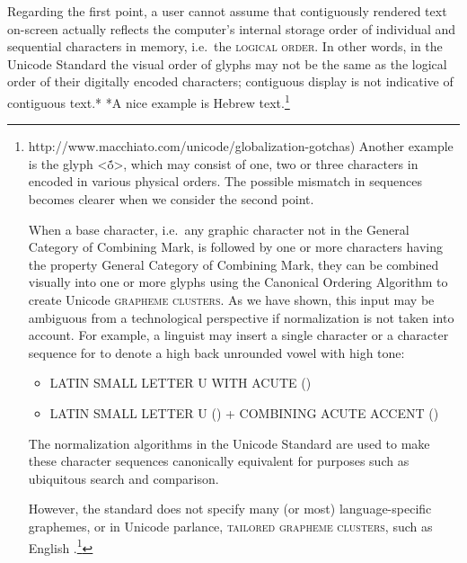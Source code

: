 {{{{{{{{{{{{{{{{{{{{{{{{{{{{{{{{{{{{{{{{{{{{{{{{{{{{{{{Regarding the first point, a user cannot assume that contiguously rendered text on-screen actually reflects the computer's internal storage order of individual and sequential characters in memory, i.e.~the \textsc{logical order}. In other words, in the Unicode Standard the visual order of glyphs may not be the same as the logical order of their digitally encoded characters; contiguous display is not indicative of contiguous text.* *A nice example is Hebrew text.\footnote{http://www.macchiato.com/unicode/globalization-gotchas) Another example is the glyph <ṍ>, which may consist of one, two or three characters in encoded in various physical orders. The possible mismatch in sequences becomes clearer when we consider the second point.

When a base character, i.e.~any graphic character not in the General Category of Combining Mark, is followed by one or more characters having the property General Category of Combining Mark, they can be combined visually into one or more glyphs using the Canonical Ordering Algorithm to create Unicode \textsc{grapheme clusters}. As we have shown, this input may be ambiguous from a technological perspective if normalization is not taken into account. For example, a linguist may insert a single character or a character sequence for to denote a high back unrounded vowel with high tone:
\begin{itemize}
	\item LATIN SMALL LETTER U WITH ACUTE () 
	\item LATIN SMALL LETTER U () + COMBINING ACUTE ACCENT () 
\end{itemize}

The normalization algorithms in the Unicode Standard are used to make these character sequences canonically equivalent for purposes such as ubiquitous search and comparison.

However, the standard does not specify many (or most) language-specific graphemes, or in Unicode parlance, \textsc{tailored grapheme clusters}, such as English .\footnote{Some (unfortunate) exceptions included for legacy purposes, and used incorrectly by linguists, include digraphs like LATIN SMALL LETTER TS DIGRAPH at  or LATIN SMALL LETTER DEZH DIGRAPH at . These and other digraphs are encoded in the Unicode Standard's IPA Extensions block.) For technological reasons, these language-specific tailored grapheme clusters must be defined outside of the Unicode Standard, in what are called (language-specific) Unicode Locale Descriptions.\footnote{http://www.unicode.org/reports/tr35/) The encoding of these multiple character sequences in Locale Descriptions is beyond the need (or technical ability) of many linguists; thus we have developed a simpler approach which we used in our own research and describe in detailed in Section XXX. Basically, the description of writing systems for lower resource languages, and in particular for document-specific descriptions (e.g.~different descriptions of the same language with different orthographies), requires an orthographic description at the (tailored) grapheme (cluster) level.

}}}}}}}}}}}}}}}}}}}}}}}}}}}}}}}}}}}}}}}}}}}}}}}}}}}}}}}}}}
